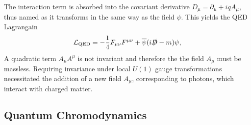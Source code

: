 The interaction term is absorbed into the covariant derivative $D_\mu = \partial_\mu + i q A_\mu$, thus named as it transforms in the same way as the field $\psi$.
This yields the QED Lagrangain
%
\begin{equation}\label{eq:qed_lagrangian}
  \mathcal{L}_{\textnormal{QED}} = -\frac{1}{4} F_{\mu\nu} F^{\mu\nu} + \overline{\psi} (i \slashed{D} - m )\psi ,
\end{equation}
%
A quadratic term $A_\mu A^\mu$ is not invariant and therefore the the field $A_\mu$ must be massless.
Requiring invariance under local $U(1)$ gauge transformations necessitated the addition of a new field $A_\mu$, corresponding to photons, which interact with charged matter. 








\subsection{Quantum Chromodynamics}\label{sec:qcd}

